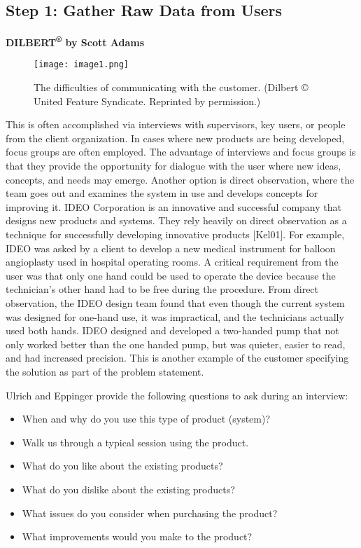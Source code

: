 \subsection*{ Step 1: Gather Raw Data from Users}

\textbf{DILBERT\textsuperscript{®} by Scott Adams}

\begin{figure}
\texttt{[image: image1.png]}
\caption{ The difficulties of communicating with the customer. (Dilbert © United Feature Syndicate. Reprinted by
permission.)}
\label{figure:dilbertCommunication}
\end{figure}


This is often accomplished via interviews with supervisors, key users,
or people from the client organization. In cases where new products are
being developed, focus groups are often employed. The advantage of
interviews and focus groups is that they provide the opportunity for
dialogue with the user where new ideas, concepts, and needs may emerge.
Another option is direct observation, where the team goes out and
examines the system in use and develops concepts for improving it. IDEO
Corporation is an innovative and successful company that designs new
products and systems. They rely heavily on direct observation as a
technique for successfully developing innovative products {[}Kel01{]}.
For example, IDEO was asked by a client to develop a new medical
instrument for balloon angioplasty used in hospital operating rooms. A
critical requirement from the user was that only one hand could be used
to operate the device because the technician's other hand had to be free
during the procedure. From direct observation, the IDEO design team
found that even though the current system was designed for one-hand use,
it was impractical, and the technicians actually used both hands. IDEO
designed and developed a two-handed pump that not only worked better
than the one handed pump, but was quieter, easier to read, and had
increased precision. This is another example of the customer specifying
the solution as part of the problem statement.

Ulrich and Eppinger provide the following questions to ask during an
interview:

\begin{itemize}
\item
  When and why do you use this type of product (system)?
\item
  Walk us through a typical session using the product.
\item
  What do you like about the existing products?
\item
  What do you dislike about the existing products?
\item
  What issues do you consider when purchasing the product?
\item
  What improvements would you make to the product?
\end{itemize}

